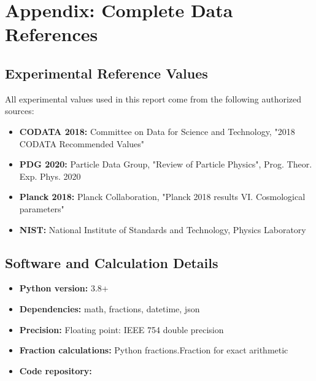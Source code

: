 \documentclass[12pt,a4paper]{report}
\begin{document}
	\section{Appendix: Complete Data References}
	
	\subsection{Experimental Reference Values}
	
	All experimental values used in this report come from the following authorized sources:
	
	\begin{itemize}
		\item \textbf{CODATA 2018:} Committee on Data for Science and Technology, "2018 CODATA Recommended Values"
		\item \textbf{PDG 2020:} Particle Data Group, "Review of Particle Physics", Prog. Theor. Exp. Phys. 2020
		\item \textbf{Planck 2018:} Planck Collaboration, "Planck 2018 results VI. Cosmological parameters"
		\item \textbf{NIST:} National Institute of Standards and Technology, Physics Laboratory
	\end{itemize}
	
	\subsection{Software and Calculation Details}
	
	\begin{itemize}
		\item \textbf{Python version:} 3.8+
		\item \textbf{Dependencies:} math, fractions, datetime, json
		\item \textbf{Precision:} Floating point: IEEE 754 double precision
		\item \textbf{Fraction calculations:} Python fractions.Fraction for exact arithmetic
		\item \textbf{Code repository:} 
	\end{itemize}
	
\end{document}
